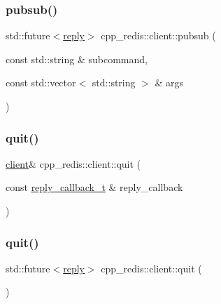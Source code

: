 \subsubsection{\texorpdfstring{pubsub()}{pubsub()}\hspace{0.1cm}{\footnotesize\ttfamily [2/2]}}
{\footnotesize\ttfamily std\+::future$<$\hyperlink{classcpp__redis_1_1reply}{reply}$>$ cpp\+\_\+redis\+::client\+::pubsub (\begin{DoxyParamCaption}\item[{const std\+::string \&}]{subcommand,  }\item[{const std\+::vector$<$ std\+::string $>$ \&}]{args }\end{DoxyParamCaption})}

\mbox{\label{classcpp__redis_1_1client_a455952961bd95a22630d1bd6c6a3f7a7}} 
\subsubsection{\texorpdfstring{quit()}{quit()}\hspace{0.1cm}{\footnotesize\ttfamily [1/2]}}
{\footnotesize\ttfamily \hyperlink{classcpp__redis_1_1client}{client}\& cpp\+\_\+redis\+::client\+::quit (\begin{DoxyParamCaption}\item[{const \hyperlink{classcpp__redis_1_1client_a061a1140d36d2eaeda82b09a0bb3f9f2}{reply\+\_\+callback\+\_\+t} \&}]{reply\+\_\+callback }\end{DoxyParamCaption})}

\mbox{\label{classcpp__redis_1_1client_a0b13beda169ce74720abf4bba2d69d68}} 
\subsubsection{\texorpdfstring{quit()}{quit()}\hspace{0.1cm}{\footnotesize\ttfamily [2/2]}}
{\footnotesize\ttfamily std\+::future$<$\hyperlink{classcpp__redis_1_1reply}{reply}$>$ cpp\+\_\+redis\+::client\+::quit (\begin{DoxyParamCaption}{ }\end{DoxyParamCaption})}

